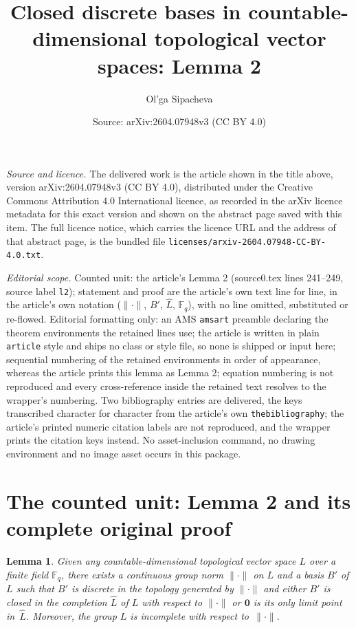 \documentclass[10pt,a4paper]{amsart}
\title[Closed discrete bases in countable-dimensional topological vector spaces]{Closed discrete bases in countable-dimensional topological vector spaces: Lemma 2}
\author{Ol'ga Sipacheva}
\date{Source: arXiv:2604.07948v3 (CC BY 4.0)}
\theoremstyle{plain}
\newtheorem{lemma}[theorem]{Lemma}
\theoremstyle{definition}
\theoremstyle{remark}
\begin{document}
\maketitle

\noindent\emph{Source and licence.} The delivered work is the article shown in the title above, version arXiv:2604.07948v3 (CC BY 4.0), distributed under the Creative Commons Attribution 4.0 International licence, as recorded in the arXiv licence metadata for this exact version and shown on the abstract page saved with this item. The full licence notice, which carries the licence URL and the address of that abstract page, is the bundled file \texttt{licenses/arxiv-2604.07948-CC-BY-4.0.txt}.\par\smallskip

\noindent\textit{Editorial scope.} Counted unit: the article's Lemma 2 (source0.tex lines 241--249, source label \texttt{l2}); statement and proof are the article's own text line for line, in the article's own notation ($\lVert\boldsymbol\cdot\rVert$, $B'$, $\widehat L$, $\mathbb F_q$), with no line omitted, substituted or re-flowed. Editorial formatting only: an AMS \texttt{amsart} preamble declaring the theorem environments the retained lines use; the article is written in plain \texttt{article} style and ships no class or style file, so none is shipped or input here; sequential numbering of the retained environments in order of appearance, whereas the article prints this lemma as Lemma 2; equation numbering is not reproduced and every cross-reference inside the retained text resolves to the wrapper's numbering. Two bibliography entries are delivered, the keys transcribed character for character from the article's own \texttt{thebibliography}; the article's printed numeric citation labels are not reproduced, and the wrapper prints the citation keys instead. No asset-inclusion command, no drawing environment and no image asset occurs in this package.


\section{The counted unit: Lemma 2 and its complete original proof}

\begin{lemma}
\label{l2}
Given any countable-dimensional topological vector space $L$ over a finite field $\mathbb F_q$, 
there exists a continuous group norm $\lVert\boldsymbol\cdot\rVert$ on $L$ and a basis $B'$ 
of $L$ such that $B'$ is discrete in the topology generated by $\lVert\boldsymbol\cdot\rVert$ and either $B'$ 
is closed in the completion $\widehat L$ of $L$ with respect to $\lVert\boldsymbol\cdot\rVert$ or $\mathbf 0$ is its 
only limit point in~$\widehat L$. Moreover, the group $L$ is incomplete with respect 
to~$\lVert\boldsymbol\cdot\rVert$. 
\end{lemma}
\end{document}
